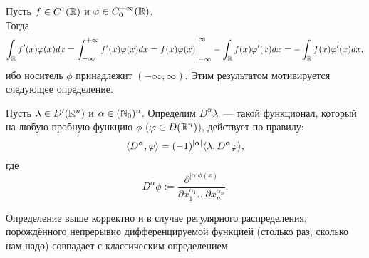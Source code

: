 \begin{note}
    Пусть $f \in C^1(\mathbb{R})$ и $\varphi \in C^{+\infty}_0(\mathbb{R})$. \\
    Тогда
    \[
        \int_{\mathbb{R}} f'(x)\varphi(x) dx = \int_{-\infty}^{+\infty} f'(x) \varphi(x) dx = f(x)\varphi(x) \bigg|^{\infty}_{-\infty} - \int_{\mathbb{R}}f(x) \varphi'(x) dx = -\int_{\mathbb{R}}f(x) \varphi'(x) dx,
    \]
    ибо носитель $\phi$ принадлежит $(-\infty, \infty)$.
    Этим результатом мотивируется следующее определение.
\end{note}
\begin{definition}
    Пусть $\lambda \in D'(\mathbb{R}^n)$ и $\alpha \in (\mathbb{N}_0)^n$.
    Определим $D^\alpha \lambda$~--- такой функционал, который на любую пробную  функцию $\phi$ ($\varphi \in D(\mathbb{R}^n)$), действует по правилу:
    \[
        \langle D^{\alpha}, \varphi \rangle = (-1)^{|\alpha|} \langle \lambda, D^{\alpha}\varphi \rangle, 
    \]
    где 
    \[
    D^{\alpha}\phi:= \dfrac{\partial^{|\alpha|\phi(x)}}{\partial x_1^{\alpha_1}\dots\partial x_n^{\alpha_n}}.
    \]
\end{definition}
\begin{theorem}
    Определение выше корректно и в случае регулярного распределения, порождённого непрерывно дифференцируемой функцией (столько раз, сколько нам надо) совпадает с классическим определением
\end{theorem}
